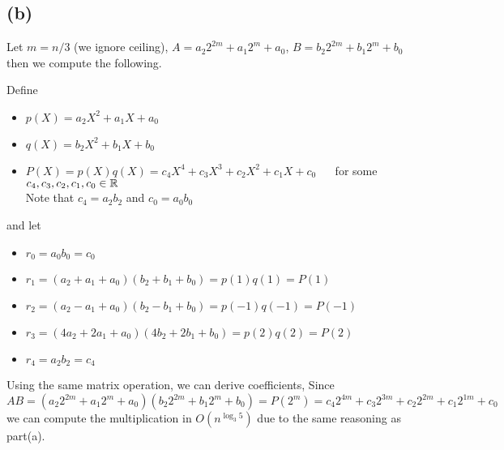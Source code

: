 \subsection*{(b)}
Let $m = n/3$ (we ignore ceiling), $A = a_2 2^{2m} + a_1 2^m + a_0$, $B = b_2 2^{2m} + b_1 2^m + b_0$
then we compute the following.

Define 

\begin{itemize}
    \item $p(X) = a_2 X^2 + a_1 X + a_0$
    \item $q(X) = b_2 X^2 + b_1 X + b_0$
    \item $P(X) = p(X)q(X) = c_4 X^4 +  c_3 X^3 +  c_2 X^2 +  c_1 X +  c_0 $ $\quad$ for some $c_4, c_3, c_2, c_1, c_0 \in \mathbb{R}$\\
    Note that $c_4 = a_2b_2$ and $c_0 = a_0b_0$
\end{itemize}

and let

\begin{itemize}
    \item $r_0 = a_0b_0 = c_0$
    \item $r_1 = (a_2 + a_1 + a_0)(b_2 + b_1 + b_0) = p(1)q(1)  = P(1)$
    \item $r_2 = (a_2 - a_1 + a_0)(b_2 - b_1 + b_0) = p(-1)q(-1) = P(-1)$
    \item $r_3 = (4a_2 + 2a_1 + a_0)(4b_2 + 2b_1 + b_0) = p(2)q(2)  = P(2)$
    \item $r_4 = a_2b_2 = c_4$
\end{itemize}

Using the same matrix operation, we can derive coefficients,
Since
\[
    AB 
    = (a_2 2^{2m} + a_1 2^m + a_0) (b_2 2^{2m} + b_1 2^m + b_0)
    = P(2^m)
    = c_4 2^{4m} +  c_3 2^{3m} +  c_2 2^{2m} +  c_1 2^{1m} +  c_0
\]
we can compute the multiplication in $O(n^{\log_3 5})$ due to the same reasoning as part(a).
